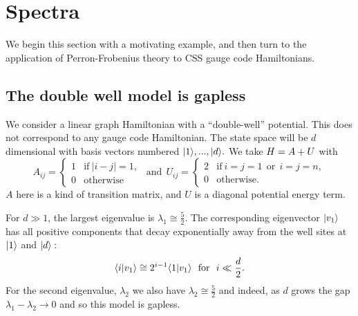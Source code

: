\documentclass[12pt]{article}
\begin{document}
%


\section{Spectra}
\label{spectra}

We begin this section with a motivating example,
and then turn to the application of
Perron-Frobenius theory to
CSS gauge code Hamiltonians.

\subsection{The double well model is gapless}

We consider a linear graph Hamiltonian
with a ``double-well'' potential.
This does not correspond to any gauge code Hamiltonian.
The state space will be $d$ dimensional with
basis vectors numbered $|{1}\rangle,...,|{d}\rangle.$
We take
$ H = A + U $
with
$$
A_{ij} = \left\{ \begin{array}{ll}
     1 &\mbox{if}\  |i-j|=1,  \\
     0 &\mbox{otherwise}\end{array}\right.
\ \ \mbox{and}\ \ 
U_{ij} =  \left\{ \begin{array}{ll}
     2 &\mbox{if}\  i=j=1 \ \ \mbox{or}\ \  i=j=n, \\
     0 &\mbox{otherwise.}\end{array}\right.
$$
$A$ here is a kind of transition matrix,
and $U$ is a diagonal potential energy term.

For $d\gg 1$, the largest
eigenvalue is $\lambda_1 \cong \frac{5}{2}$.
The corresponding eigenvector $|{v_1}\rangle$
has all positive components that
decay exponentially away from the well sites
at $|{1}\rangle$ and $|{d}\rangle:$
$$
    \langle{i}|{v_1}\rangle 
    \cong 2^{i-1} \langle{1}|{v_1}\rangle
    \ \ \mbox{for}\ \ i\ll \frac{d}{2}.
$$
For the second eigenvalue, $\lambda_2$
we also have  $\lambda_2 \cong \frac{5}{2}$
and indeed, as $d$ grows
the gap $\lambda_1 - \lambda_2 \rightarrow 0$
and so this model is gapless.
\end{document}
